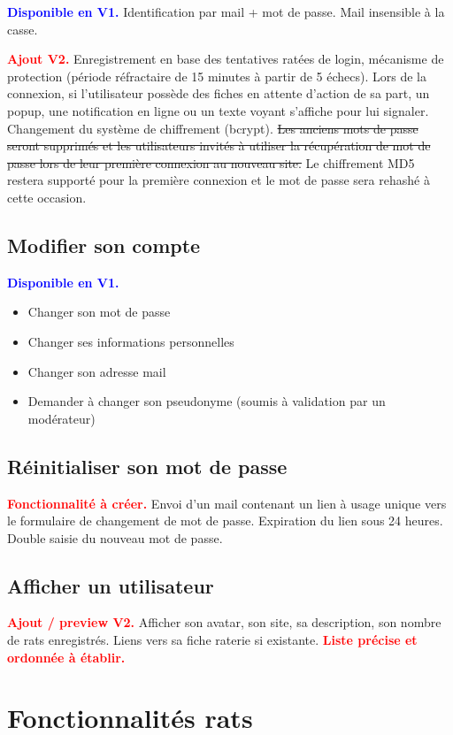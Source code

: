 ﻿\documentclass[a4paper,10pt]{article}
\newcommand\existant[1]{\noindent\textbf{\textcolor{blue}{#1}}}
\newcommand\desire[1]{\noindent\textbf{\textcolor{red}{#1}}}
\begin{document}
\existant{Disponible en V1.} Identification par mail + mot de passe. Mail insensible à la casse.

\desire{Ajout V2.} Enregistrement en base des tentatives ratées de login, mécanisme de protection (période réfractaire de 15 minutes à partir de 5 échecs). Lors de la connexion, si l'utilisateur possède des fiches en attente d'action de sa part, un popup, une notification en ligne ou un texte voyant s'affiche pour lui signaler. Changement du système de chiffrement (bcrypt). \sout{Les anciens mots de passe seront supprimés et les utilisateurs invités à utiliser la récupération de mot de passe lors de leur première connexion au nouveau site.} Le chiffrement MD5 restera supporté pour la première connexion et le mot de passe sera rehashé à cette occasion.

\subsection{Modifier son compte}

\existant{Disponible en V1.}
\begin{itemize}
\item Changer son mot de passe
\item Changer ses informations personnelles 
\item Changer son adresse mail
\item Demander à changer son pseudonyme (soumis à validation par un modérateur)
\end{itemize}

\subsection{Réinitialiser son mot de passe}
\desire{Fonctionnalité à créer.} Envoi d'un mail contenant un lien à usage unique vers le formulaire de changement de mot de passe. Expiration du lien sous 24 heures. Double saisie du nouveau mot de passe.

\subsection{Afficher un utilisateur}

\desire{Ajout / preview V2.} Afficher son avatar, son site, sa description, son nombre de rats enregistrés. Liens vers sa fiche raterie si existante. \desire{Liste précise et ordonnée à établir.}

\section{Fonctionnalités rats}
\end{document}
